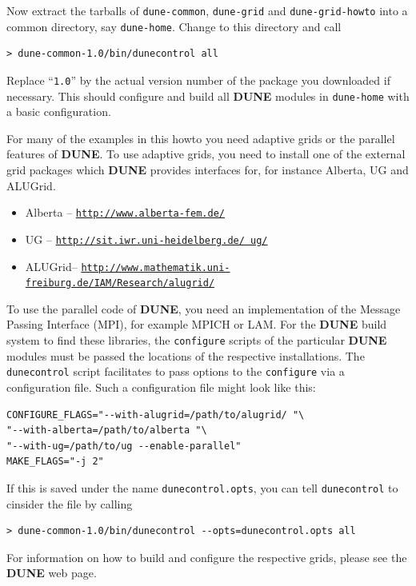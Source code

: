 \documentclass[11pt,a4paper,headinclude,footinclude,DIV16,normalheadings]{scrreprt}
\newcommand{\Dune}{{\sf\bfseries DUNE}}
\begin{document}
Now extract the tarballs of \texttt{dune-common}, \texttt{dune-grid}
and \texttt{dune-grid-howto} into a common directory, say
\texttt{dune-home}.  Change to this directory and call
\begin{lstlisting}
> dune-common-1.0/bin/dunecontrol all
\end{lstlisting}
Replace ``\texttt{1.0}'' by the actual version number of the package
you downloaded if necessary.  This should configure and build all
\Dune{} modules in \texttt{dune-home} with a basic configuration.

For many of the examples in this howto you need adaptive grids or the
parallel features of \Dune{}.  To use adaptive grids, you need to
install one of the external grid packages which \Dune{} provides
interfaces for, for instance Alberta, UG and ALUGrid.
\begin{itemize}
\item Alberta -- \href{http://www.alberta-fem.de/}{\texttt{http://www.alberta-fem.de/}}
\item UG -- \href{http://sit.iwr.uni-heidelberg.de/~ug/}{\texttt{http://sit.iwr.uni-heidelberg.de/~ug/}}
\item ALUGrid-- \href{http://www.mathematik.uni-freiburg.de/IAM/Research/alugrid/}{\texttt{http://www.mathematik.uni-freiburg.de/IAM/Research/alugrid/}}
\end{itemize}
To use the parallel code of \Dune{}, you need an implementation of the
Message Passing Interface (MPI), for example MPICH or LAM.  For the
\Dune{} build system to find these libraries, the \texttt{configure}
scripts of the particular \Dune{} modules must be passed the locations
of the respective installations.  The \texttt{dunecontrol} script
facilitates to pass options to the \texttt{configure} via a
configuration file.  Such a configuration file might look like this:
\begin{lstlisting}
CONFIGURE_FLAGS="--with-alugrid=/path/to/alugrid/ "\
"--with-alberta=/path/to/alberta "\
"--with-ug=/path/to/ug --enable-parallel"
MAKE_FLAGS="-j 2"
\end{lstlisting}
If this is saved under the name \texttt{dunecontrol.opts}, you
can tell \texttt{dunecontrol} to cinsider the file by calling
\begin{lstlisting}
> dune-common-1.0/bin/dunecontrol --opts=dunecontrol.opts all
\end{lstlisting}

For information on how to build and configure the respective grids,
please see the \Dune{} web page.
\end{document}
